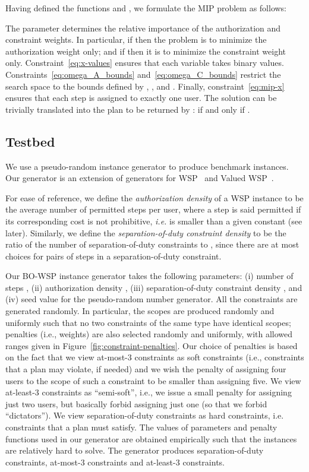 \documentclass[jcs,crcready]{iosart1c}
\newcommand{\BOWSP}{\textsc{BO-WSP}\xspace}
\begin{document}
 Having defined the functions  and , we formulate the MIP problem as follows:
 
 The parameter  determines the relative importance of the authorization and constraint weights.
 In particular, if  then the problem is to minimize the authorization weight only; and if  then it is to minimize the constraint weight only.
 Constraint~\eqref{eq:x-values} ensures that each variable  takes binary values.
 Constraints~\eqref{eq:omega_A_bounds} and~\eqref{eq:omega_C_bounds} restrict the search space to the bounds defined by , ,  and .
 Finally, constraint~\eqref{eq:mip-x} ensures that each step is assigned to exactly one user.
 The solution  can be trivially translated into the plan  to be returned by :  if and only if .

\subsection{Testbed}
\label{sec:testbed}

 We use a pseudo-random instance generator to produce benchmark instances.
 Our generator is an extension of generators for WSP~\cite{KaGaGu} and Valued WSP~\cite{CrGuKa15}.
 
 For ease of reference, we define the \emph{authorization density} of a WSP instance to be the average
number of permitted steps per user, where a step is said permitted if its
corresponding cost is not prohibitive, \textit{i.e.} is smaller than a given constant  (see later).
 Similarly, we define the \emph{separation-of-duty constraint density} to be the ratio of the number of separation-of-duty constraints to , since there are at most  choices for pairs of steps in a separation-of-duty constraint.
 
 Our \BOWSP instance generator takes the following parameters: (i) number of steps , (ii) authorization density , (iii) separation-of-duty constraint density , and (iv) seed value for the pseudo-random number generator.
  All the constraints are generated randomly.
 In particular, the scopes are produced randomly and uniformly such that no two constraints of the same type have identical scopes; penalties (i.e., weights) are also selected randomly and uniformly, with allowed ranges given in Figure~\ref{fig:constraint-penalties}. Our choice of penalties is based on the fact that we view at-most-3 constraints as soft constraints (i.e., constraints that a plan may violate, if needed) and we wish the penalty of assigning four users to the scope of such a constraint to be smaller than assigning five. We view at-least-3 constraints as ``semi-soft'', i.e., we issue a small penalty for assigning just two users, but basically forbid assigning just one (so that we forbid ``dictators''). We view separation-of-duty constraints as hard constraints, i.e. constraints that a plan must satisfy. 
The values of parameters and penalty functions used in our generator are obtained empirically such that the instances are relatively hard to solve.
The generator produces  separation-of-duty constraints,  at-most-3 constraints and  at-least-3 constraints.
\end{document}
